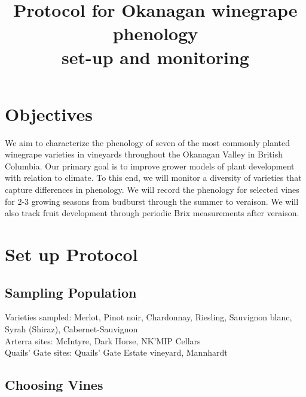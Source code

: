 \documentclass[11pt,letter]{article}
\begin{document}

\renewcommand{\refname}{\CHead{}}

\title{Protocol for Okanagan winegrape phenology \\ set-up and monitoring}
\date{ }
\maketitle
\tableofcontents



\section{Objectives}
We aim to characterize the phenology of seven of the most commonly planted winegrape varieties in vineyards throughout the Okanagan Valley in British Columbia. Our primary goal is to improve grower models of plant development with relation to climate. To this end, we will monitor a diversity of varieties that capture differences in phenology. We will record the phenology for selected vines for 2-3 growing seasons from budburst through the summer to veraison. We will also track fruit development through periodic Brix measurements after veraison.

\section{Set up Protocol}

\subsection{Sampling Population}
Varieties sampled: Merlot, Pinot noir, Chardonnay, Riesling, Sauvignon blanc, Syrah (Shiraz), Cabernet-Sauvignon \\
Arterra sites: McIntyre, Dark Horse, NK'MIP Cellars \\ %
Quails' Gate sites: Quails' Gate Estate vineyard, Mannhardt \\

\subsection{Choosing Vines}
\end{document}
